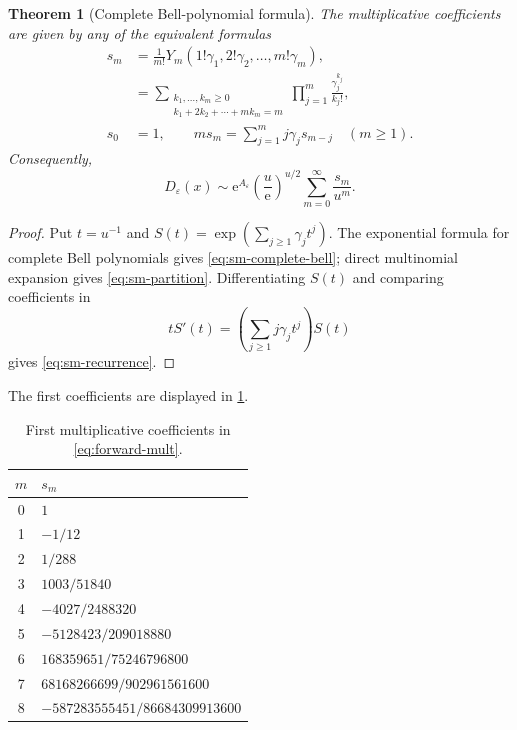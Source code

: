 \documentclass[11pt,a4paper,oneside]{book}
\newtheorem{theorem}{Theorem}[chapter]
\newcommand{\e}{\mathrm e}
\newcommand{\eps}{\varepsilon}
\begin{document}
\begin{theorem}[Complete Bell-polynomial formula]\label{thm:forward-bell}
The multiplicative coefficients are given by any of the equivalent formulas
\begin{align}
 s_m
 &=\frac1{m!}
   Y_m(1!\gamma_1,2!\gamma_2,\ldots,m!\gamma_m),
   \label{eq:sm-complete-bell}\\
 &=\sum_{\substack{k_1,\ldots,k_m\ge0\\
                   k_1+2k_2+\cdots+mk_m=m}}
   \prod_{j=1}^m\frac{\gamma_j^{k_j}}{k_j!},
   \label{eq:sm-partition}\\
 s_0&=1,\qquad
 m s_m=\sum_{j=1}^m j\gamma_j s_{m-j}
 \quad(m\ge1).
 \label{eq:sm-recurrence}
\end{align}
Consequently,
\begin{equation}\label{eq:forward-mult}
 \boxed{
 D_\eps(x)
 \sim
 \e^{A_\eps}
 \left(\frac{u}{\e}\right)^{u/2}
 \sum_{m=0}^\infty\frac{s_m}{u^m}.}
\end{equation}
\end{theorem}

\begin{proof}
Put \(t=u^{-1}\) and
\(S(t)=\exp(\sum_{j\ge1}\gamma_jt^j)\).  The exponential formula for complete
Bell polynomials gives \cref{eq:sm-complete-bell}; direct multinomial expansion
gives \cref{eq:sm-partition}.  Differentiating
\(S(t)\) and comparing coefficients in
\[
 tS'(t)=
 \left(\sum_{j\ge1}j\gamma_jt^j\right)S(t)
\]
gives \cref{eq:sm-recurrence}.
\end{proof}

The first coefficients are displayed in \cref{tab:s-coeff}.
\begin{table}[ht]
\centering
\caption{First multiplicative coefficients in \cref{eq:forward-mult}.}
\label{tab:s-coeff}
\begin{tabular}{c@{\qquad}l}
\toprule
\(m\)&\(s_m\)\\
\midrule
0&\(1\)\\
1&\(-1/12\)\\
2&\(1/288\)\\
3&\(1003/51840\)\\
4&\(-4027/2488320\)\\
5&\(-5128423/209018880\)\\
6&\(168359651/75246796800\)\\
7&\(68168266699/902961561600\)\\
8&\(-587283555451/86684309913600\)\\
\bottomrule
\end{tabular}
\end{table}
\end{document}
